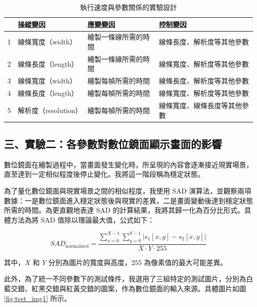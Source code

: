 \documentclass[12pt]{article}
\begin{document}
\begin{table}[h]
  \centering
  \caption{執行速度與參數關係的實驗設計}\label{table:sc2_des}
  \begin{tabular}{p{0.2cm}p{3.5cm}p{4.5cm}p{6cm}}
    \toprule
      & 操縱變因 & 應變變因 & 控制變因 \\ 
    \midrule
    1 & 線條寬度（width） & 繪製一條線所需的時間 & 線條長度、解析度等其他參數 \\ 
    2 & 線條長度（length） & 繪製一條線所需的時間 & 線條寬度、解析度等其他參數 \\ 
    3 & 線條寬度（width） & 繪製每幀所需的時間 & 線條長度、解析度等其他參數 \\ 
    4 & 線條長度（length） & 繪製每幀所需的時間 & 線條寬度、解析度等其他參數 \\ 
    5 & 解析度（resolution） & 繪製每幀所需的時間 & 線條寬度、線條長度等其他參數 \\ 
    \bottomrule
  \end{tabular}
\end{table}

\subsection{三、實驗二：各參數對數位鏡面顯示畫面的影響}

數位鏡面在繪製過程中，當畫面發生變化時，所呈現的內容會逐漸接近現實場景，直至達到一定相似程度後停止變化。我將這一階段稱為穩定狀態。

為了量化數位鏡面與現實場景之間的相似程度，我使用 SAD 演算法，並觀察兩項數據：一是數位鏡面進入穩定狀態後與現實的差異，二是畫面變動後達到穩定狀態所需的時間。為更直觀地表達 SAD 的計算結果，我將其歸一化為百分比形式。具體方法為將 SAD 值除以理論最大值，公式如下：

\[
SAD_{\text{normalized}} = \frac{\sum_{x=0}^{X-1} \sum_{y=0}^{Y-1} \left| s_1[x, y] - s_2[x, y] \right|}{X \cdot Y \cdot 255}
\]

其中，$X$ 和 $Y$ 分別為圖片的寬度與高度，$255$ 為像素值的最大可能差異。

此外，為了統一不同參數下的測試條件，我選用了三組特定的測試圖片，分別為白藍交錯、紅黑交錯與紅黃交錯的圖案，作為數位鏡面的輸入來源。具體圖片如圖\ref{fig:test_img1} 所示。
\end{document}
